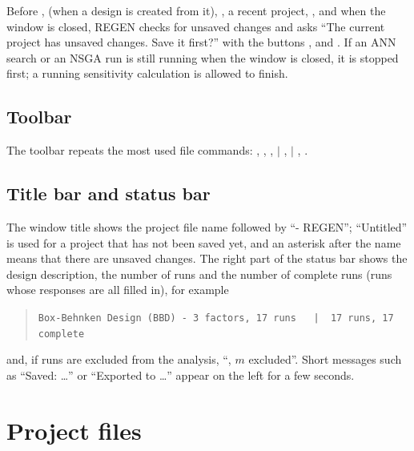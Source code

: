 Before ,  (when a design is created from it), , a recent
project, ,  and when the window is closed, REGEN checks for unsaved
changes and asks ``The current project has unsaved changes. Save it first?'' with the buttons ,
 and . If an ANN search or an NSGA run is still running when the window is closed, it is
stopped first; a running sensitivity calculation is allowed to finish.

\subsection{Toolbar}
The toolbar repeats the most used file commands: , , ,  $|$
,  $|$ , .

\subsection{Title bar and status bar}
The window title shows the project file name followed by ``- REGEN''; ``Untitled'' is used for a project that has
not been saved yet, and an asterisk after the name means that there are unsaved changes. The right part of the
status bar shows the design description, the number of runs and the number of complete runs (runs whose responses
are all filled in), for example
\begin{quote}\small
\texttt{Box-Behnken Design (BBD) - 3 factors, 17 runs \ \ |\ \ 17 runs, 17 complete}
\end{quote}
and, if runs are excluded from the analysis, ``, $m$ excluded''. Short messages such as ``Saved: \dots'' or
``Exported to \dots'' appear on the left for a few seconds.

\section{Project files}
\label{sec:ch02-files}

